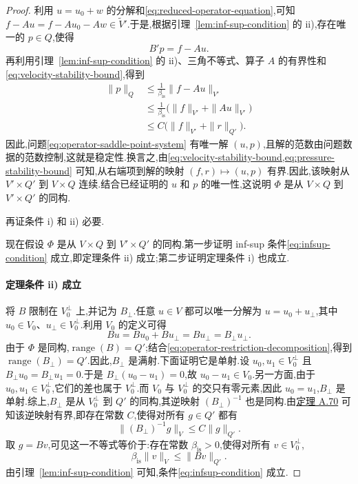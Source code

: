 \begin{proof}
利用 $u=u_0+w$ 的分解和\cref{eq:reduced-operator-equation},可知 $f-Au=f-Au_0-Aw\in\widetilde{V}'$.于是,根据引理~\ref{lem:inf-sup-condition} 的 ii),存在唯一的 $p\in Q$,使得
\[
  B'p=f-Au.
\]
再利用引理~\ref{lem:inf-sup-condition} 的 ii)、三角不等式、算子 $A$ 的有界性和\cref{eq:velocity-stability-bound},得到
\begin{equation}\label{eq:pressure-stability-bound}
\begin{aligned}
  \|p\|_Q
    &\le\frac{1}{\beta_{\mathrm{is}}}\|f-Au\|_{V'}\\
    &\le\frac{1}{\beta_{\mathrm{is}}}
       \bigl(\|f\|_{V'}+\|Au\|_{V'}\bigr)\\
    &\le C\bigl(\|f\|_{V'}+\|r\|_{Q'}\bigr).
\end{aligned}
\end{equation}
因此,问题\cref{eq:operator-saddle-point-system} 有唯一解 $(u,p)$,且解的范数由问题数据的范数控制,这就是稳定性.换言之,由\cref{eq:velocity-stability-bound,eq:pressure-stability-bound} 可知,从右端项到解的映射 $(f,r)\mapsto(u,p)$ 有界.因此,该映射从 $V'\times Q'$ 到 $V\times Q$ 连续.结合已经证明的 $u$ 和 $p$ 的唯一性,这说明 $\Phi$ 是从 $V\times Q$ 到 $V'\times Q'$ 的同构.

再证条件 i) 和 ii) 必要.

现在假设 $\Phi$ 是从 $V\times Q$ 到 $V'\times Q'$ 的同构.第一步证明 inf-sup 条件\cref{eq:infsup-condition} 成立,即定理条件 ii) 成立;第二步证明定理条件 i) 也成立.

\paragraph{定理条件 ii) 成立}
将 $B$ 限制在 $V_0^{\perp}$ 上,并记为 $B_{\perp}$.任意 $u\in V$ 都可以唯一分解为 $u=u_0+u_{\perp}$,其中 $u_0\in V_0$、$u_{\perp}\in V_0^{\perp}$.利用 $V_0$ 的定义可得
\begin{equation}\label{eq:operator-restriction-decomposition}
  Bu=Bu_0+Bu_{\perp}=Bu_{\perp}=B_{\perp}u_{\perp}.
\end{equation}
由于 $\Phi$ 是同构,$\operatorname{range}(B)=Q'$;结合\cref{eq:operator-restriction-decomposition},得到 $\operatorname{range}(B_{\perp})=Q'$.因此,$B_{\perp}$ 是满射.下面证明它是单射.设 $u_0,u_1\in V_0^{\perp}$ 且 $B_{\perp}u_0=B_{\perp}u_1=0$.于是 $B_{\perp}(u_0-u_1)=0$,故 $u_0-u_1\in V_0$.另一方面,由于 $u_0,u_1\in V_0^{\perp}$,它们的差也属于 $V_0^{\perp}$.而 $V_0$ 与 $V_0^{\perp}$ 的交只有零元素,因此 $u_0=u_1$,$B_{\perp}$ 是单射.综上,$B_{\perp}$ 是从 $V_0^{\perp}$ 到 $Q'$ 的同构,其逆映射 $(B_{\perp})^{-1}$ 也是同构.由\hyperref[thm:appendix-a-70]{定理 A.70} 可知该逆映射有界,即存在常数 $C$,使得对所有 $g\in Q'$ 都有
\[
  \|(B_{\perp})^{-1}g\|_V\le C\|g\|_{Q'}.
\]
取 $g=Bv$,可见这一不等式等价于:存在常数 $\beta_{\mathrm{is}}>0$,使得对所有 $v\in V_0^{\perp}$,
\[
  \beta_{\mathrm{is}}\|v\|_V\le\|Bv\|_{Q'}.
\]
由引理~\ref{lem:inf-sup-condition} 可知,条件\cref{eq:infsup-condition} 成立.


\end{proof}
